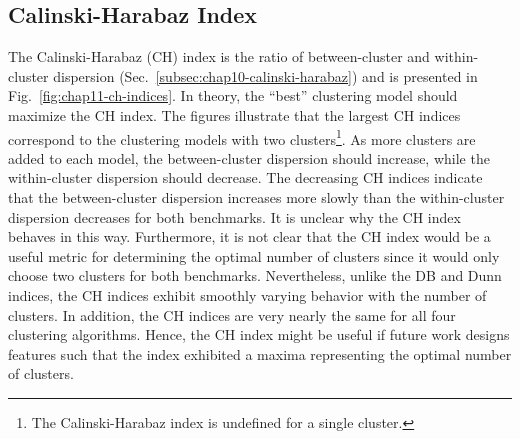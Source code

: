 \clearpage

\subsection{Calinski-Harabaz Index}
\label{subsec:chap11-ch-index}

The Calinski-Harabaz (CH) index is the ratio of between-cluster and within-cluster dispersion (Sec.~\ref{subsec:chap10-calinski-harabaz}) and is presented in Fig.~\ref{fig:chap11-ch-indices}. In theory, the ``best'' clustering model should maximize the CH index. The figures illustrate that the largest CH indices correspond to the clustering models with two clusters\footnote{The Calinski-Harabaz index is undefined for a single cluster.}. As more clusters are added to each model, the between-cluster dispersion should increase, while the within-cluster dispersion should decrease. The decreasing CH indices indicate that the between-cluster dispersion increases more slowly than the within-cluster dispersion decreases for both benchmarks. It is unclear why the CH index behaves in this way. Furthermore, it is not clear that the CH index would be a useful metric for determining the optimal number of clusters since it would only choose two clusters for both benchmarks. Nevertheless, unlike the DB and Dunn indices, the CH indices exhibit smoothly varying behavior with the number of clusters. In addition, the CH indices are very nearly the same for all four clustering algorithms. Hence, the CH index might be useful if future work designs features such that the index exhibited a maxima representing the optimal number of clusters.

